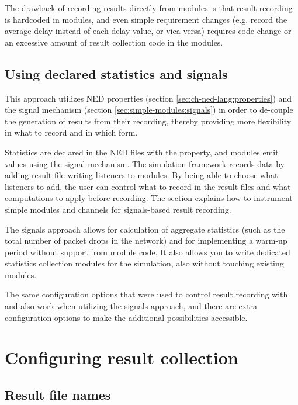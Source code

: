 The drawback of recording results directly from modules is that result
recording is hardcoded in modules, and even simple requirement changes
(e.g. record the average delay instead of each delay value, or vica versa)
requires code change or an excessive amount of result collection code
in the modules.

\subsection{Using declared statistics and signals}

This approach utilizes NED properties (section
\ref{sec:ch-ned-lang:properties}) and the signal mechanism (section
\ref{sec:simple-modules:signals}) in order to de-couple the generation of
results from their recording, thereby providing more flexibility in what to
record and in which form.

Statistics are declared in the NED files with the  property,
and modules emit values using the signal mechanism. The simulation
framework records data by adding result file writing listeners to modules.
By being able to choose what listeners to add, the user can control what to
record in the result files and what computations to apply before recording.
The section \label{sec:ch-simple-modules:statistic-signals} explains how to
instrument simple modules and channels for signals-based result recording.

The signals approach allows for calculation of aggregate statistics (such as the
total number of packet drops in the network) and for implementing a warm-up
period without support from module code. It also allows you to write
dedicated statistics collection modules for the simulation, also without
touching existing modules.

The same configuration options that were used to control result recording
with  and  also work when utilizing
the signals approach, and there are extra configuration options to make
the additional possibilities accessible.


\section{Configuring result collection}

\subsection{Result file names}

